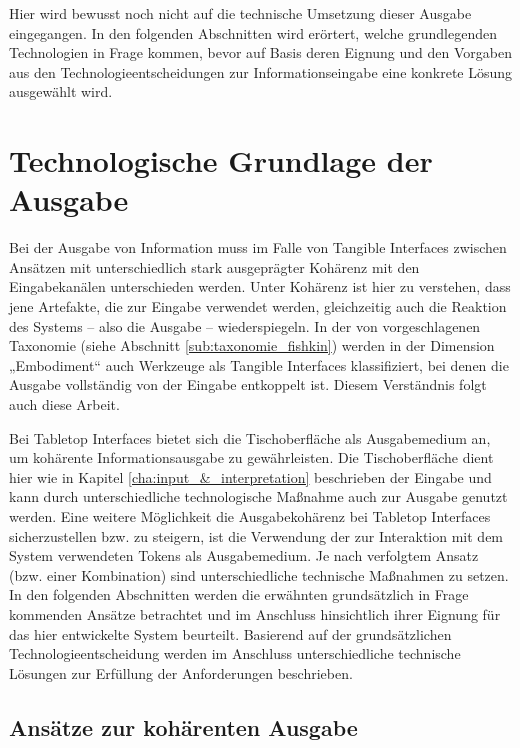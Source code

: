 Hier wird bewusst noch nicht auf die technische Umsetzung dieser Ausgabe eingegangen. In den folgenden Abschnitten wird erörtert, welche grundlegenden Technologien in Frage kommen, bevor auf Basis deren Eignung und den Vorgaben aus den Technologieentscheidungen zur Informationseingabe eine konkrete Lösung ausgewählt wird.


\section{Technologische Grundlage der Ausgabe} %
\label{sec:technologische_grundlage_der_visualisierung}

Bei der Ausgabe von Information muss im Falle von Tangible Interfaces zwischen Ansätzen mit unterschiedlich stark ausgeprägter Kohärenz mit den Eingabekanälen unterschieden werden. Unter Kohärenz ist hier zu verstehen, dass jene Artefakte, die zur Eingabe verwendet werden, gleichzeitig auch die Reaktion des Systems -- also die Ausgabe -- wiederspiegeln. In der von \citet{Fishkin04} vorgeschlagenen Taxonomie (siehe Abschnitt \ref{sub:taxonomie_fishkin}) werden in der Dimension „Embodiment“ auch Werkzeuge als Tangible Interfaces klassifiziert, bei denen die Ausgabe vollständig von der Eingabe entkoppelt ist. Diesem Verständnis folgt auch diese Arbeit.

Bei Tabletop Interfaces bietet sich die Tischoberfläche als Ausgabemedium an, um kohärente Informationsausgabe zu gewährleisten. Die Tischoberfläche dient hier wie in Kapitel \ref{cha:input_&_interpretation} beschrieben der Eingabe und kann durch unterschiedliche technologische Maßnahme auch zur Ausgabe genutzt werden. Eine weitere Möglichkeit die Ausgabekohärenz bei Tabletop Interfaces sicherzustellen bzw. zu steigern, ist die Verwendung der zur Interaktion mit dem System verwendeten Tokens als Ausgabemedium. Je nach verfolgtem Ansatz (bzw. einer Kombination) sind unterschiedliche technische Maßnahmen zu setzen. In den folgenden Abschnitten werden die erwähnten grundsätzlich in Frage kommenden Ansätze betrachtet und im Anschluss hinsichtlich ihrer Eignung für das hier entwickelte System beurteilt. Basierend auf der grundsätzlichen Technologieentscheidung werden im Anschluss unterschiedliche technische Lösungen zur Erfüllung der Anforderungen beschrieben.

\subsection{Ansätze zur kohärenten Ausgabe} %
\label{sub:kohärente_ausgabe}

